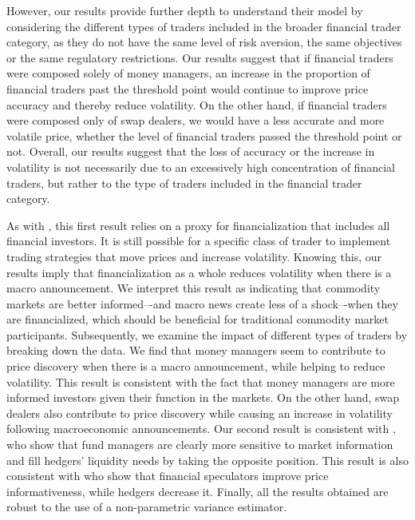 \documentclass[12pt]{article}
\begin{document}
However, our results provide further depth to understand their model by considering the different types of traders included in the broader financial trader category, as they do not have the same level of risk aversion, the same objectives or the same regulatory restrictions. Our results suggest that if financial traders were composed solely of money managers, an increase in the proportion of financial traders past the threshold point would continue to improve price accuracy and thereby reduce volatility. On the other hand, if financial traders were composed only of swap dealers, we would have a less accurate and more volatile price, whether the level of financial traders passed the threshold point or not. Overall, our results suggest that the loss of accuracy or the increase in volatility is not necessarily due to an excessively high concentration of financial traders, but rather to the type of traders included in the financial trader category.


As with \citet{brunetti2009speculation}, this first result relies on a proxy for financialization that includes all financial investors. It is still possible for a specific class of trader to implement trading strategies that move prices and increase volatility. Knowing this, our results imply that financialization as a whole reduces volatility when there is a macro announcement. We interpret this result as indicating that commodity markets are better informed–-and macro news create less of a shock–-when they are financialized, which should be beneficial for traditional commodity market participants. Subsequently, we examine the impact of different types of traders by breaking down the data. We find that money managers seem to contribute to price discovery when there is a macro announcement, while helping to reduce volatility. This result is consistent with the fact that money managers are more informed investors given their function in the markets. On the other hand, swap dealers also contribute to price discovery while causing an increase in volatility following macroeconomic announcements. Our second result is consistent with \citet{cheng2012convective}, who show that fund managers are clearly more sensitive to market information and fill hedgers’ liquidity needs by taking the opposite position. This result is also consistent with  \citet{goldstein2014speculation} who show that financial speculators improve price informativeness, while hedgers decrease it. Finally, all the results obtained are robust to the use of a non-parametric variance estimator. 
 
\end{document}
